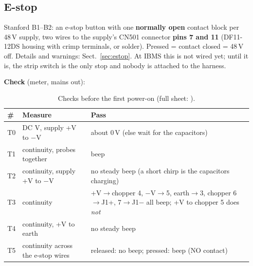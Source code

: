 \subsection{E-stop}
Stanford B1--B2: an e-stop button with one \textbf{normally open} contact block per 48\,V supply, two wires
to the supply's CN501 connector \textbf{pins 7 and 11} (DF11-12DS housing with crimp terminals, or solder).
Pressed = contact closed = 48\,V off. Details and warnings: Sect.~\ref{sec:estop}. At IBMS this is not wired
yet; until it is, the strip switch is the only stop and nobody is attached to the harness.

\textbf{Check} (meter, mains out):
\begin{table}[H]\centering\small
\begin{tabularx}{\linewidth}{llX}
\toprule
\# & Measure & Pass \\
\midrule
T0 & DC V, supply +V to $-$V & about 0\,V (else wait for the capacitors) \\
T1 & continuity, probes together & beep \\
T2 & continuity, supply +V to $-$V & no steady beep (a short chirp is the capacitors charging) \\
T3 & continuity & +V$\rightarrow$chopper 4, $-$V$\rightarrow$5, earth$\rightarrow$3, chopper 6$\rightarrow$J1+, 7$\rightarrow$J1$-$ all beep; +V to chopper 5 does \emph{not} \\
T4 & continuity, +V to earth & no steady beep \\
T5 & continuity across the e-stop wires & released: no beep; pressed: beep (NO contact) \\
\bottomrule
\end{tabularx}
\caption{Checks before the first power-on (full sheet: ).}
\label{tab:powerchecks}
\end{table}

